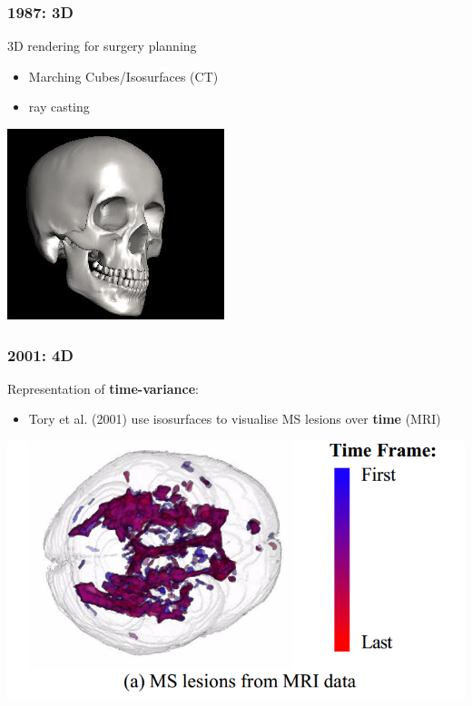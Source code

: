 \documentclass{beamer}
\begin{document}
\begin{frame}
	\frametitle{1987: 3D}
	3D rendering for surgery planning
	\begin{itemize}
		\item Marching Cubes/Isosurfaces (CT)
		\item ray casting
	\end{itemize}
	\begin{center}
		\includegraphics[width=.4\textwidth,height=.4\textheight]{images/marching}
	\end{center}
\end{frame}

\begin{frame}
	\frametitle{2001: 4D}
	Representation of \textbf{time-variance}:
	\begin{itemize}
		\item Tory et al. (2001) use isosurfaces to visualise MS lesions over
			\textbf{time} (MRI)
	\end{itemize}
	\begin{center}
		\includegraphics[width=.8\textwidth]{images/ms_time}
	\end{center}
\end{frame}
\end{document}
